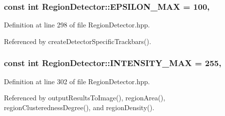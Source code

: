 \hypertarget{classmultiscale_1_1analysis_1_1RegionDetector_a724d57c0db65696f2ddab415deb1138d}{
\subsubsection[{E\-P\-S\-I\-L\-O\-N\-\_\-\-M\-A\-X}]{\setlength{\rightskip}{0pt plus 5cm}const int Region\-Detector\-::\-E\-P\-S\-I\-L\-O\-N\-\_\-\-M\-A\-X = 100\hspace{0.3cm}{\ttfamily [static]}, {\ttfamily [private]}}}\label{classmultiscale_1_1analysis_1_1RegionDetector_a724d57c0db65696f2ddab415deb1138d}


Definition at line 298 of file Region\-Detector.\-hpp.



Referenced by create\-Detector\-Specific\-Trackbars().

\hypertarget{classmultiscale_1_1analysis_1_1RegionDetector_a3b682d43cd686a8bdfce91b0cbbf5245}{
\subsubsection[{I\-N\-T\-E\-N\-S\-I\-T\-Y\-\_\-\-M\-A\-X}]{\setlength{\rightskip}{0pt plus 5cm}const int Region\-Detector\-::\-I\-N\-T\-E\-N\-S\-I\-T\-Y\-\_\-\-M\-A\-X = 255\hspace{0.3cm}{\ttfamily [static]}, {\ttfamily [private]}}}\label{classmultiscale_1_1analysis_1_1RegionDetector_a3b682d43cd686a8bdfce91b0cbbf5245}


Definition at line 302 of file Region\-Detector.\-hpp.



Referenced by output\-Results\-To\-Image(), region\-Area(), region\-Clusteredness\-Degree(), and region\-Density().

